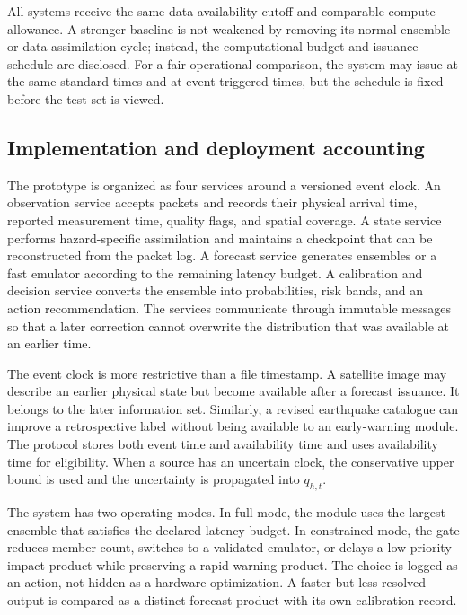 \documentclass[conference]{IEEEtran}
\begin{document}
All systems receive the same data availability cutoff and comparable compute allowance. A stronger baseline is not weakened by removing its normal ensemble or data-assimilation cycle; instead, the computational budget and issuance schedule are disclosed. For a fair operational comparison, the system may issue at the same standard times and at event-triggered times, but the schedule is fixed before the test set is viewed.

\subsection{Implementation and deployment accounting}

The prototype is organized as four services around a versioned event clock. An observation service accepts packets and records their physical arrival time, reported measurement time, quality flags, and spatial coverage. A state service performs hazard-specific assimilation and maintains a checkpoint that can be reconstructed from the packet log. A forecast service generates ensembles or a fast emulator according to the remaining latency budget. A calibration and decision service converts the ensemble into probabilities, risk bands, and an action recommendation. The services communicate through immutable messages so that a later correction cannot overwrite the distribution that was available at an earlier time.

The event clock is more restrictive than a file timestamp. A satellite image may describe an earlier physical state but become available after a forecast issuance. It belongs to the later information set. Similarly, a revised earthquake catalogue can improve a retrospective label without being available to an early-warning module. The protocol stores both event time and availability time and uses availability time for eligibility. When a source has an uncertain clock, the conservative upper bound is used and the uncertainty is propagated into $q_{h,t}$.

The system has two operating modes. In full mode, the module uses the largest ensemble that satisfies the declared latency budget. In constrained mode, the gate reduces member count, switches to a validated emulator, or delays a low-priority impact product while preserving a rapid warning product. The choice is logged as an action, not hidden as a hardware optimization. A faster but less resolved output is compared as a distinct forecast product with its own calibration record.
\end{document}
